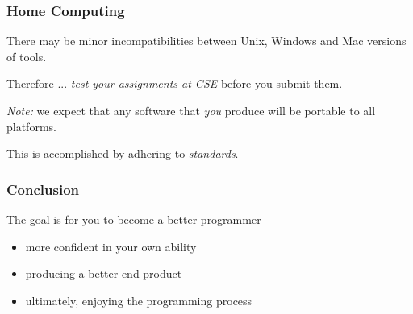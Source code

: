 \begin{frame}
\frametitle{Home Computing}
There may be minor incompatibilities between Unix, Windows and Mac
versions of tools.

Therefore ... {\em{test your assignments at CSE}} before you submit them.

{\small 
{\em{Note:}} we expect that any software that {\em{you}}
produce will be portable to all platforms.

This is accomplished by adhering to {\it{standards}}.
}
\end{frame}

\begin{frame}
\frametitle{Conclusion}
The goal is for you to become a better programmer
\begin{itemize}
\item  more confident in your own ability
\item  producing a better end-product
\item  ultimately, enjoying the programming process
\end{itemize}
\end{frame}


